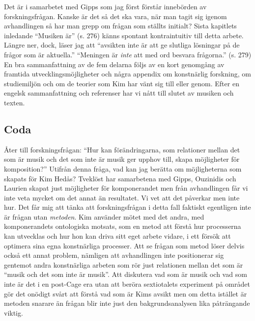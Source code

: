 \documentclass[a4paper]{article}
\begin{document}
Det är i samarbetet med Gipps som jag först förstår innebörden av forskningsfrågan. Kanske är det så det ska vara, när man tagit sig igenom avhandlingen så har man grepp om frågan som ställts initialt? Sista kapitlets inledande ``Musiken är'' (s. 276) känns spontant kontraintuitiv till detta arbete. Längre ner, dock, läser jag att ``avsikten inte är att ge slutliga lösningar på de frågor som är aktuella.'' ``Meningen är \emph{inte} att med ord besvara frågorna.'' (s. 279) En bra sammanfattning av de fem delarna följs av en kort genomgång av framtida utvecklingsmöjligheter och några appendix om konstnärlig forskning, om studiemiljön och om de teorier som Kim har vänt sig till eller genom. Efter en engelsk sammanfattning och referenser har vi nått till slutet av musiken och texten.

\subsection*{Coda}

Åter till forskningsfrågan: ``Hur kan förändringarna, som relationer mellan det som är musik och det som inte är musik ger upphov till, skapa möjligheter för komposition?'' Utifrån denna fråga, vad kan jag berätta om möjligheterna som skapats för Kim Hedås? Tveklöst har samarbetena med Gipps, Ouzinidis och Laurien skapat just möjligheter för komponerandet men från avhandlingen får vi inte veta mycket om det annat än resultatet. Vi vet att det påverkar men inte hur. Det får mig att tänka att forskningsfrågan i detta fall faktiskt egentligen inte är frågan utan \emph{metoden}. Kim använder mötet med det andra, med komponerandets ontologiska motsats, som en metod att förstå hur processerna kan utvecklas och hur hon kan driva sitt eget arbete vidare, i ett försök att optimera sina egna konstnärliga processer. Att se frågan som metod löser delvis också ett annat problem, nämligen att avhandlingen inte positionerar sig gentemot andra konstnärliga arbeten som rör just relationen mellan det som är ``musik och det som inte är musik''. Att diskutera vad som är musik och vad som inte är det i en post-Cage era utan att beröra sextiotalets experiment på området gör det onödigt svårt att förstå vad som är Kims avsikt men om detta istället är metoden snarare än frågan blir inte just den bakgrundsanalysen lika påträngande viktig. 
\end{document}
